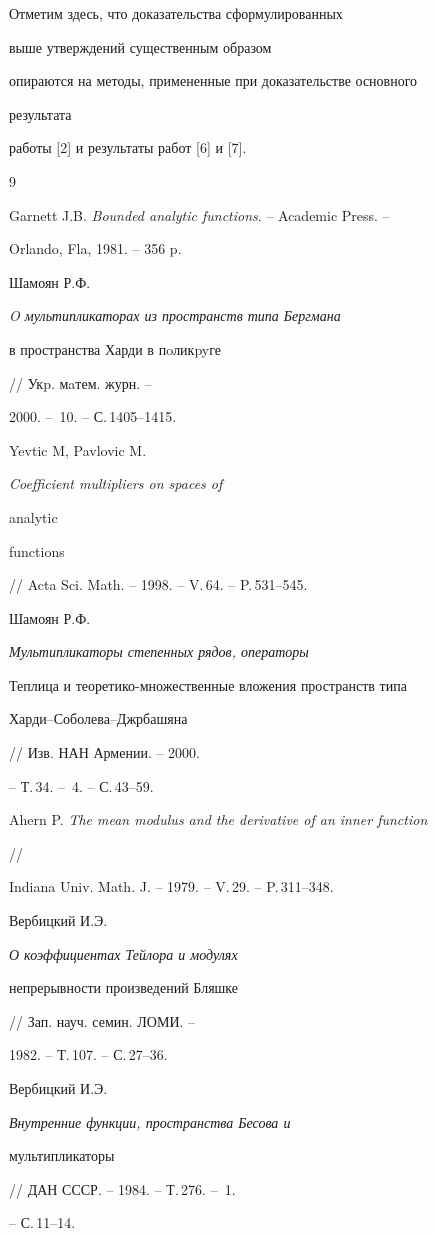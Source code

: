  


Отметим здесь, что доказательства сформулированных


выше утверждений существенным образом 


опираются на методы, примененные при доказательстве основного 


результата 


работы [2] и результаты работ [6] и [7]. 


 


\begin{thebibliography}{9} 


 




Garnett J.B. {\em Bounded analytic functions}. -- Academic Press. -- 


Orlando, Fla, 1981. -- 356 p. 




Шамоян Р.Ф. {\em O мультипликаторах из пространств типа Бергмана 


в пространства Харди в пoликpyге} // Укp. мaтем. журн. -- 


2000. -- \No\,10. -- С.\,1405--1415. 




Yevtic M, Pavlovic M. {\em Coefficient multipliers on spaces of 


analytic 


functions} // Acta Sci. Math. -- 1998. -- V.\,64. -- P.\,531--545. 




Шамоян Р.Ф. {\em Мультипликаторы степенных рядов, операторы 


Теплица и теоретико-мно\-жест\-вен\-ные вложения пространств типа 


Харди--Соболева--Джрбашяна} // Изв. НАН Армении. -- 2000. 


-- Т.\,34. -- \No\,4. -- С.\,43--59. 




Ahern P. {\em The mean modulus and the derivative of an inner function} 


// 


Indiana Univ. Math. J. -- 1979. -- V.\,29. -- P.\,311--348. 




Вербицкий И.Э. {\em О коэффициентах Тейлора и модулях 


непрерывности произведений Бляшке} // Зап. науч. семин. ЛОМИ. -- 


1982. -- Т.\,107. -- С.\,27--36. 




Вербицкий И.Э. {\em Внутренние функции, пространства Бесова и 


мультипликаторы} // ДАН СССР. -- 1984. -- Т.\,276. -- \No\,1. 


-- С.\,11--14. 


 


\end{thebibliography} 


